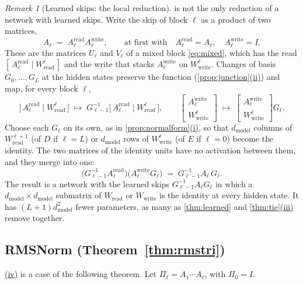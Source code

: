 \documentclass[10pt]{article}
\theoremstyle{definition}
\theoremstyle{remark}
\newtheorem{remark}[theorem]{Remark}
\newcommand{\Wread}{W_{\mathrm{read}}}
\newcommand{\Wwrite}{W_{\mathrm{write}}}
\newcommand{\dm}{d_{\mathrm{model}}}
\DeclareRobustCommand{\cpref}[2]{\hyperref[#1:#2]{\cref*{#1}(#2)}}
\DeclareRobustCommand{\Cpref}[2]{\hyperref[#1:#2]{\Cref*{#1}(#2)}}
\begin{document}
\begin{remark}[Learned skips: the local reduction]\label{rem:locallearned}
 is not the only reduction of a network with learned skips. Write the skip of block $\ell$ as a product of two matrices,
\[
A_\ell \;=\; A^{\mathrm{read}}_\ell A^{\mathrm{write}}_\ell, \qquad\text{at first with}\quad A^{\mathrm{read}}_\ell = A_\ell,\quad A^{\mathrm{write}}_\ell = I .
\]
These are the matrices $U_\ell$ and $V_\ell$ of a mixed block \eqref{eq:mixed}, which has the read $[\,A^{\mathrm{read}}_\ell \mid \Wread^{\ell}\,]$ and the write that stacks $A^{\mathrm{write}}_\ell$ on $\Wwrite^{\ell}$. Changes of basis $G_0, \dots, G_L$ at the hidden states preserve the function (\cpref{prop:junction}{ii}) and map, for every block $\ell$,
\[
\big[\,A^{\mathrm{read}}_\ell \mid \Wread^{\ell}\,\big] \;\mapsto\; G_{\ell-1}^{-1}\big[\,A^{\mathrm{read}}_\ell \mid \Wread^{\ell}\,\big], \qquad
\begin{bmatrix} A^{\mathrm{write}}_\ell \\ \Wwrite^{\ell} \end{bmatrix} \;\mapsto\; \begin{bmatrix} A^{\mathrm{write}}_\ell \\ \Wwrite^{\ell} \end{bmatrix} G_\ell .
\]
Choose each $G_\ell$ on its own, as in \cpref{prop:normalform}{i}, so that $\dm$ columns of $\Wread^{\ell+1}$ (of $D$ if $\ell = L$) or $\dm$ rows of $\Wwrite^{\ell}$ (of $E$ if $\ell = 0$) become the identity. The two matrices of the identity units have no activation between them, and they merge into one:
\[
\big(G_{\ell-1}^{-1}A^{\mathrm{read}}_\ell\big)\big(A^{\mathrm{write}}_\ell G_\ell\big) \;=\; G_{\ell-1}^{-1}A_\ell\,G_\ell .
\]
The result is a network with the learned skips $G_{\ell-1}^{-1}A_\ell G_\ell$ in which a $\dm\times\dm$ submatrix of $\Wread$ or $\Wwrite$ is the identity at every hidden state. It has $(L+1)\dm^2$ fewer parameters, as many as \cref{thm:learned} and \cpref{thm:tie}{iii} remove together.
\end{remark}


\subsection{RMSNorm\texorpdfstring{ (Theorem~\ref*{thm:rmstri})}{}}\label{app:prf-rms}

\Cpref{thm:rmstri}{iv} is a case of the following theorem. Let $\Pi_\ell = A_1\cdots A_\ell$, with $\Pi_0 = I$.
\end{document}

